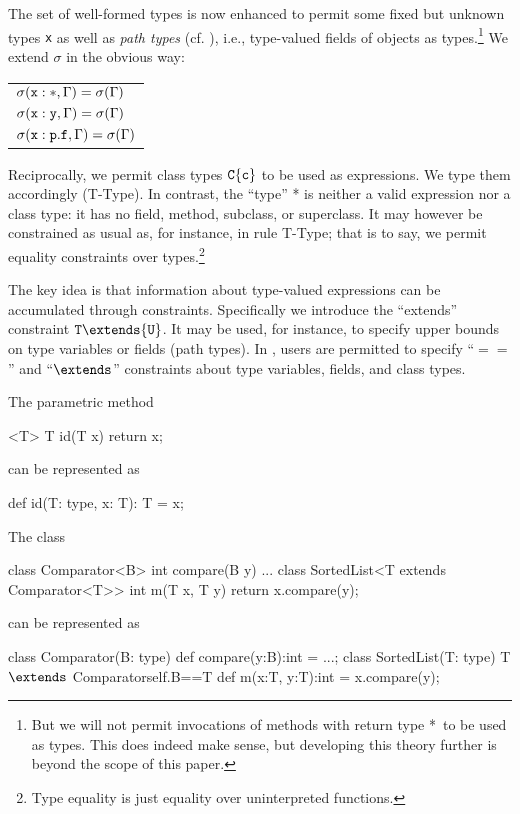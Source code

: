 {The set of well-formed types is now enhanced to permit some fixed but unknown
types {\tt x} as well as \emph{path types} (cf. \cite{scala}),
i.e., type-valued fields of objects as types.\footnote{But we will not permit invocations of methods with return type *\ to be 
used as types. This does indeed make sense, but developing
this theory further is beyond the scope of this paper.} We extend $\sigma$ in the obvious way:
%
\begin{center}
\begin{tabular}{l}
$	\sigma({\tt x}:*, \Gamma)=\sigma(\Gamma)$\\
$\sigma({\tt x}:{\tt y}, \Gamma)=\sigma(\Gamma)$\\
$\sigma({\tt x}:{\tt p}.{\tt f}, \Gamma)=\sigma(\Gamma)$
\end{tabular}
\end{center}
%
Reciprocally, we permit class types ${\tt C}\{{\tt c}\}$ to be
used as expressions. We type them accordingly ({\sc T-Type}). In
contrast, the ``type'' *{} is neither a valid expression nor
a class type: it has no field, method, subclass, or superclass.
It may however be constrained as usual as, for instance, in rule
{\sc T-Type}; that is to say, we permit equality constraints over types.\footnote{Type equality is just equality over uninterpreted functions.}

The key idea is that information about type-valued expressions can
be accumulated through constraints. Specifically we introduce 
the ``extends'' constraint ${\tt T}\extends{\tt U}$. It may be used, for
instance, to specify upper bounds on type variables or fields (path
types). In \FXG{}, users are permitted to specify ``$==$'' and ``$\extends$'' constraints
about type variables, fields, and class types.

\begin{example}
The \FGJ{} parametric method

\begin{xten} 
<T> T id(T x) { return x; }
\end{xten}
\noindent can be represented as
\begin{xten} 
def id(T: type, x: T): T = x;
\end{xten}
\end{example}

\begin{example}
\noindent The \FGJ{} class 
\begin{xten} 
class Comparator<B> {
  int compare(B y) { ... } }
class SortedList<T extends Comparator<T>> { 
  int m(T x, T y) { return x.compare(y); } }
\end{xten}
\noindent can be represented as
\begin{xtenmath} 
class Comparator(B: type) {
  def compare(y:B):int = ...; }
class SortedList(T: type)
    {T $\extends$ Comparator{self.B==T}} { 
  def m(x:T, y:T):int = x.compare(y); }
\end{xtenmath}
\end{example}

}
